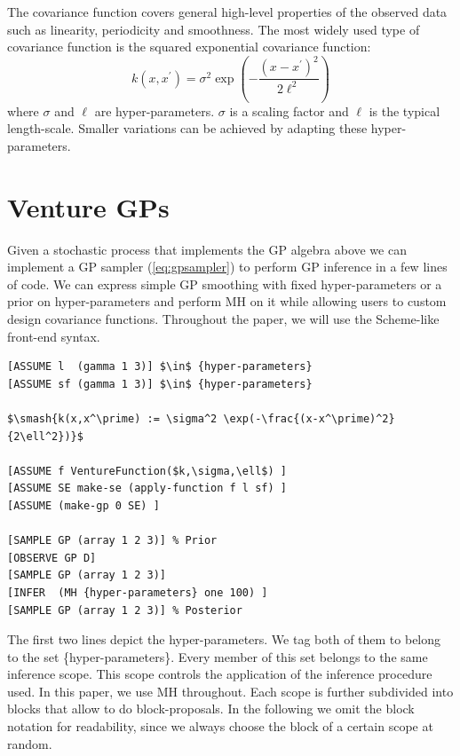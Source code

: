 \documentclass{article} %
\begin{document}
The covariance function covers general high-level properties of the observed data such as linearity, periodicity and smoothness. The most widely used type of covariance function is the squared exponential covariance function:
\begin{equation}
k(x,x^\prime) = \sigma^2 \exp(-\frac{(x-x^\prime)^2}{2\ell^2})
\end{equation}
where $\sigma$ and $\ell$ are hyper-parameters. $\sigma$ is a scaling factor and $\ell$ is the typical length-scale.
Smaller variations can be achieved by adapting these hyper-parameters. 
\section{Venture GPs}
Given a stochastic process that implements the GP algebra above we can implement a GP sampler (\ref{eq:gpsampler}) to perform GP inference in a few lines of code. We can express simple GP smoothing with fixed hyper-parameters or a prior on hyper-parameters and perform MH on it while allowing users to custom design covariance functions. Throughout the paper, we will use the Scheme-like front-end syntax. 
\begin{minipage}{\linewidth}
\footnotesize
\belowcaptionskip=-10pt
\begin{lstlisting}[frame=single,label=alg:gpNeal,caption=Bayesian GP Smoothing,mathescape,label=alg:gpsmooth]
[ASSUME l  (gamma 1 3)] $\in$ {hyper-parameters} 
[ASSUME sf (gamma 1 3)] $\in$ {hyper-parameters}

$\smash{k(x,x^\prime) := \sigma^2 \exp(-\frac{(x-x^\prime)^2}{2\ell^2})}$

[ASSUME f VentureFunction($k,\sigma,\ell$) ]
[ASSUME SE make-se (apply-function f l sf) ]
[ASSUME (make-gp 0 SE) ]

[SAMPLE GP (array 1 2 3)] % Prior
[OBSERVE GP D]
[SAMPLE GP (array 1 2 3)] 
[INFER  (MH {hyper-parameters} one 100) ]
[SAMPLE GP (array 1 2 3)] % Posterior

\end{lstlisting}
\end{minipage}

The first two lines depict the hyper-parameters. We tag both of them to belong to the set \{hyper-parameters\}. Every member of this set belongs to the same inference scope. This scope controls the application of the inference procedure used. In this paper, we use MH throughout. Each scope is further subdivided into blocks that allow to do block-proposals. In the following we omit the block notation for readability, since we always choose the block of a certain scope at random.
\end{document}
